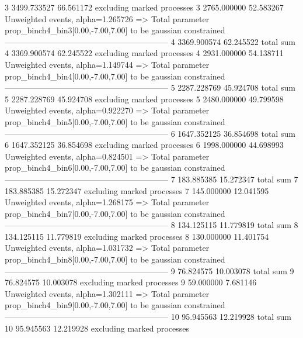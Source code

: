 3          3499.733527     66.561172       excluding marked processes    
3          2765.000000     52.583267       Unweighted events, alpha=1.265726
  => Total parameter prop_binch4_bin3[0.00,-7.00,7.00] to be gaussian constrained
------------------------------------------------------------
4          3369.900574     62.245522       total sum                     
4          3369.900574     62.245522       excluding marked processes    
4          2931.000000     54.138711       Unweighted events, alpha=1.149744
  => Total parameter prop_binch4_bin4[0.00,-7.00,7.00] to be gaussian constrained
------------------------------------------------------------
5          2287.228769     45.924708       total sum                     
5          2287.228769     45.924708       excluding marked processes    
5          2480.000000     49.799598       Unweighted events, alpha=0.922270
  => Total parameter prop_binch4_bin5[0.00,-7.00,7.00] to be gaussian constrained
------------------------------------------------------------
6          1647.352125     36.854698       total sum                     
6          1647.352125     36.854698       excluding marked processes    
6          1998.000000     44.698993       Unweighted events, alpha=0.824501
  => Total parameter prop_binch4_bin6[0.00,-7.00,7.00] to be gaussian constrained
------------------------------------------------------------
7          183.885385      15.272347       total sum                     
7          183.885385      15.272347       excluding marked processes    
7          145.000000      12.041595       Unweighted events, alpha=1.268175
  => Total parameter prop_binch4_bin7[0.00,-7.00,7.00] to be gaussian constrained
------------------------------------------------------------
8          134.125115      11.779819       total sum                     
8          134.125115      11.779819       excluding marked processes    
8          130.000000      11.401754       Unweighted events, alpha=1.031732
  => Total parameter prop_binch4_bin8[0.00,-7.00,7.00] to be gaussian constrained
------------------------------------------------------------
9          76.824575       10.003078       total sum                     
9          76.824575       10.003078       excluding marked processes    
9          59.000000       7.681146        Unweighted events, alpha=1.302111
  => Total parameter prop_binch4_bin9[0.00,-7.00,7.00] to be gaussian constrained
------------------------------------------------------------
10         95.945563       12.219928       total sum                     
10         95.945563       12.219928       excluding marked processes    
